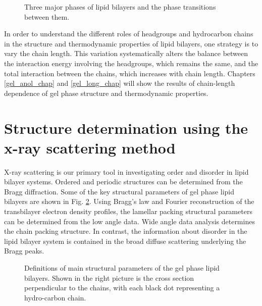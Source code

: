 
\begin{figure}
\label{intro_phase}
\centerline {}
\caption{Three major phases of lipid bilayers and the phase
transitions between them.}
\end{figure}

In order to understand the different roles of headgroups and hydrocarbon
chains in the structure and thermodynamic properties of lipid
bilayers, one strategy is to vary the chain length. This variation 
systematically alters the balance between the interaction energy 
involving the headgroups, which remains the same, and the total 
interaction between the chains, which increases with chain length. 
Chapters \ref{gel_anol_chap} and \ref{gel_long_chap} will show
the results of chain-length dependence of gel phase structure 
and thermodynamic properties. 

\section{Structure determination using the x-ray scattering method}
\label{intro_chap_xray}

X-ray scattering is our primary tool in investigating order and
disorder in lipid bilayer systems. Ordered and periodic
structures can be determined from the Bragg diffraction.
Some of the key structural parameters of gel phase lipid bilayers 
are shown in Fig. \ref{intro_struc}. Using Bragg's law and 
Fourier reconstruction of the transbilayer electron density profiles, 
the lamellar packing structural parameters can be determined from the 
low angle data. Wide angle data analysis determines the 
chain packing structure. 
In contrast, the information about disorder in the lipid bilayer system
is contained in the broad diffuse scattering underlying the
Bragg peaks. 


\begin{figure}
\label{intro_struc}
\centerline {}
\caption{Definitions of main structural parameters of the gel phase
lipid bilayers. Shown in the right picture is the cross section
perpendicular to the chains, with each black dot representing
a hydro-carbon chain.}
\end{figure}

